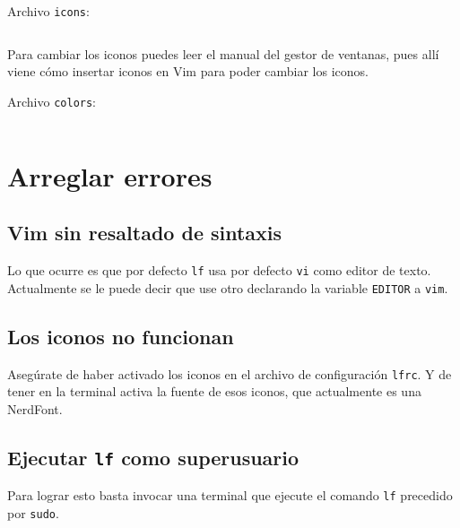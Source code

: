 \documentclass{article}
\begin{document}
    Archivo \texttt{icons}:

    \inputminted[breaklines, breakanywhere, breaksymbolleft="", breaksymbolright="", breakanywheresymbolpre="", breakanywheresymbolpost=""]
    {vim}{inc/icons}

    Para cambiar los iconos puedes leer el manual del gestor de ventanas, pues
    allí viene cómo insertar iconos en Vim para poder cambiar los iconos.

    Archivo \texttt{colors}:

    \inputminted[breaklines, breakanywhere, breaksymbolleft="", breaksymbolright="", breakanywheresymbolpre="", breakanywheresymbolpost=""]
    {vim}{inc/colors}

    \section{Arreglar errores}
    \subsection{Vim sin resaltado de sintaxis}
    Lo que ocurre es que por defecto \texttt{lf} usa por defecto \texttt{vi}
    como editor de texto. Actualmente se le puede decir que use otro declarando
    la variable \texttt{EDITOR} a \texttt{vim}.

    \subsection{Los iconos no funcionan}
    Asegúrate de haber activado los iconos en el archivo de configuración
    \texttt{lfrc}. Y de tener en la terminal activa la fuente de esos
    iconos, que actualmente es una NerdFont.

    \subsection{Ejecutar \texttt{lf} como superusuario}
    Para lograr esto basta invocar una terminal que ejecute el comando
    \texttt{lf} precedido por \texttt{sudo}.
\end{document}
